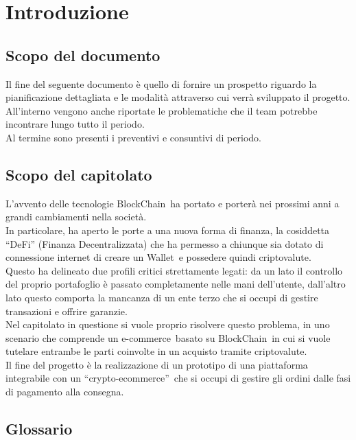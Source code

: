 \section{Introduzione} \label{section:introduzione}

\subsection{Scopo del documento} \label{subsection:intro_scopo_documento}
Il fine del seguente documento è quello di fornire un prospetto riguardo la pianificazione dettagliata e le modalità attraverso cui verrà sviluppato il progetto.\\
All'interno vengono anche riportate le problematiche che il team potrebbe incontrare lungo tutto il periodo.\\
Al termine sono presenti i preventivi e consuntivi di periodo.

\subsection{Scopo del capitolato} \label{subsection:intro_scopo_capitolato}
L'avvento delle tecnologie BlockChain\glo\ ha portato e porterà nei prossimi anni a grandi cambiamenti nella società.\\
In particolare, ha aperto le porte a una nuova forma di finanza, la cosiddetta “DeFi” (Finanza Decentralizzata) che ha permesso a chiunque sia dotato di connessione
 internet di creare un Wallet\glo\ e possedere quindi criptovalute\glo.\\
Questo ha delineato due profili critici strettamente legati: da un lato il controllo del proprio portafoglio è passato completamente nelle mani dell'utente, 
dall'altro lato questo comporta la mancanza di un ente terzo che si occupi di gestire transazioni e offrire garanzie.\\
Nel capitolato in questione si vuole proprio risolvere questo problema, in uno scenario che comprende un e-commerce\glo\ basato su BlockChain\glo\ in cui si 
vuole tutelare entrambe le parti coinvolte in un acquisto tramite criptovalute.\\
Il fine del progetto è la realizzazione di un prototipo di una piattaforma integrabile con un “crypto-ecommerce”\glo\, che si occupi di gestire gli ordini dalle 
fasi di pagamento alla consegna.

\subsection{Glossario} \label{subsection:intro_glossario}
\gloDesc

